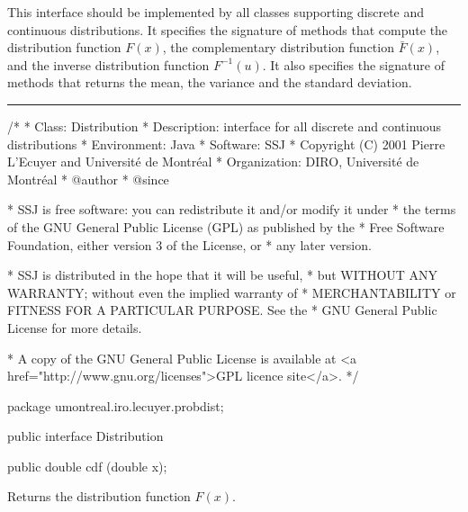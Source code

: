 
This interface should be implemented by all classes supporting 
discrete and continuous distributions. %
It specifies the signature of methods that compute
the distribution function $F(x)$,
the complementary distribution function $\bar F(x)$,
and the inverse distribution function $ F^{-1} (u)$.
%
It also specifies the signature of methods that returns the mean,
the variance and the standard deviation.

\bigskip\hrule

\begin{code}
\begin{hide}
/*
 * Class:        Distribution
 * Description:  interface for all discrete and continuous distributions
 * Environment:  Java
 * Software:     SSJ 
 * Copyright (C) 2001  Pierre L'Ecuyer and Université de Montréal
 * Organization: DIRO, Université de Montréal
 * @author       
 * @since

 * SSJ is free software: you can redistribute it and/or modify it under
 * the terms of the GNU General Public License (GPL) as published by the
 * Free Software Foundation, either version 3 of the License, or
 * any later version.

 * SSJ is distributed in the hope that it will be useful,
 * but WITHOUT ANY WARRANTY; without even the implied warranty of
 * MERCHANTABILITY or FITNESS FOR A PARTICULAR PURPOSE.  See the
 * GNU General Public License for more details.

 * A copy of the GNU General Public License is available at
   <a href="http://www.gnu.org/licenses">GPL licence site</a>.
 */
\end{hide}
package umontreal.iro.lecuyer.probdist;


public interface Distribution\begin{hide} {\end{hide}

   public double cdf (double x);
\end{code}
\begin{tabb} Returns the distribution function $F(x)$.
\end{tabb}
\begin{htmlonly}
\end{htmlonly}
